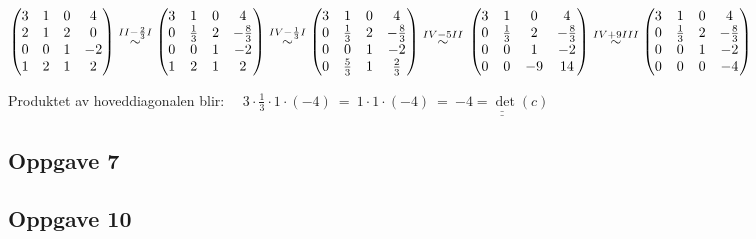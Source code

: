 \documentclass{article}
\newcommand{\uu}[1]{\underline{\underline{#1}}}
\newcommand{\eqqto}[1]{\overset{\substack{#1}}{\sim}}
\begin{document}
\begin{enumerate}[a = ]
\(
\begin{pmatrix}
3&1&0&4\\
2&1&2&0\\
0&0&1&-2\\
1&2&1&2\\
\end{pmatrix}
\eqqto{II-\frac{2}{3}I}
\begin{pmatrix}
3&1&0&4\\
0&\frac{1}{3}&2&-\frac{8}{3}\\
0&0&1&-2\\
1&2&1&2
\end{pmatrix}
\eqqto{IV-\frac{1}{3}I}
\begin{pmatrix}
3&1&0&4\\
0&\frac{1}{3}&2&-\frac{8}{3}\\
0&0&1&-2\\
0&\frac{5}{3}&1&\frac{2}{3}
\end{pmatrix}
\eqqto{IV-5II}
\\\\\\
\begin{pmatrix}
3&1&0&4\\
0&\frac{1}{3}&2&-\frac{8}{3}\\
0&0&1&-2\\
0&0&-9&14
\end{pmatrix}
\eqqto{IV+9III}
\begin{pmatrix}
3&1&0&4\\
0&\frac{1}{3}&2&-\frac{8}{3}\\
0&0&1&-2\\
0&0&0&-4
\end{pmatrix}
\)
\end{enumerate}

Produktet av hoveddiagonalen blir: \(\quad 3 \cdot \frac{1}{3} \cdot 1 \cdot (-4) \ = \  1\cdot1\cdot(-4) \ = \ \uu{-4 = \det(c)}\)

\newpage
\subsection*{Oppgave 7}

\subsection*{Oppgave 10}
\\\\
\end{document}
